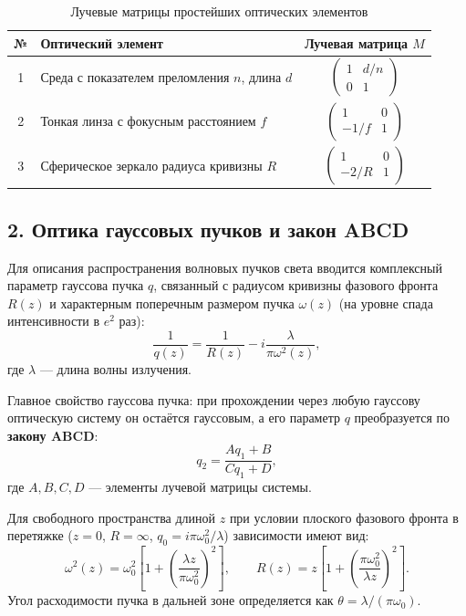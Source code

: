 \documentclass[12pt, a4paper]{article}
\begin{document}
\begin{table}[h]
\centering
\caption{Лучевые матрицы простейших оптических элементов}
\label{tab:matrices}
\begin{tabular}{|c|l|c|}
\hline
№ & Оптический элемент & Лучевая матрица $M$ \\
\hline
1 & Среда с показателем преломления $n$, длина $d$ & $\begin{pmatrix} 1 & d/n \\ 0 & 1 \end{pmatrix}$ \\
\hline
2 & Тонкая линза с фокусным расстоянием $f$ & $\begin{pmatrix} 1 & 0 \\ -1/f & 1 \end{pmatrix}$ \\
\hline
3 & Сферическое зеркало радиуса кривизны $R$ & $\begin{pmatrix} 1 & 0 \\ -2/R & 1 \end{pmatrix}$ \\
\hline
\end{tabular}
\end{table}

\subsection*{2. Оптика гауссовых пучков и закон ABCD}
Для описания распространения волновых пучков света вводится комплексный параметр гауссова пучка $q$, связанный с радиусом кривизны фазового фронта $R(z)$ и характерным поперечным размером пучка $\omega(z)$ (на уровне спада интенсивности в $e^2$ раз):
\begin{equation}
    \frac{1}{q(z)} = \frac{1}{R(z)} - i \frac{\lambda}{\pi \omega^2(z)},
\end{equation}
где $\lambda$ --- длина волны излучения. 

Главное свойство гауссова пучка: при прохождении через любую гауссову оптическую систему он остаётся гауссовым, а его параметр $q$ преобразуется по \textbf{закону ABCD}:
\begin{equation}
    q_2 = \frac{A q_1 + B}{C q_1 + D},
\end{equation}
где $A, B, C, D$ --- элементы лучевой матрицы системы. 

Для свободного пространства длиной $z$ при условии плоского фазового фронта в перетяжке ($z=0$, $R=\infty$, $q_0 = i\pi\omega_0^2/\lambda$) зависимости имеют вид:
\begin{equation}
    \omega^2(z) = \omega_0^2 \left[ 1 + \left(\frac{\lambda z}{\pi \omega_0^2}\right)^2 \right], \qquad
    R(z) = z \left[ 1 + \left(\frac{\pi \omega_0^2}{\lambda z}\right)^2 \right].
\end{equation}
Угол расходимости пучка в дальней зоне определяется как $\theta = \lambda / (\pi \omega_0)$.
\end{document}
